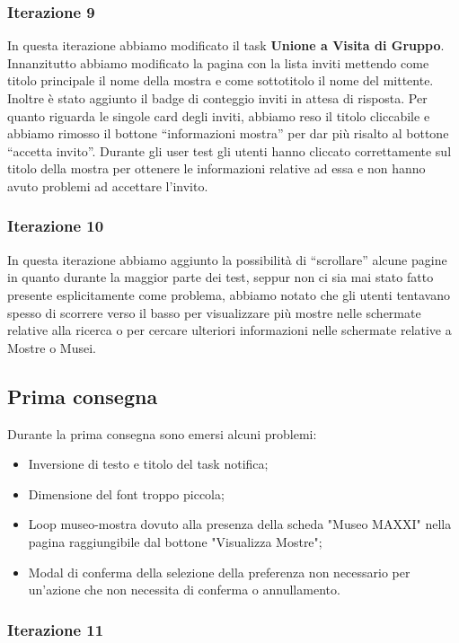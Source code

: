 \subsubsection{Iterazione 9}
In questa iterazione abbiamo modificato il task \textbf{Unione a Visita di Gruppo}. Innanzitutto abbiamo modificato la pagina con la lista inviti mettendo come titolo principale il nome della mostra e come sottotitolo il nome del mittente. Inoltre è stato aggiunto il badge di conteggio inviti in attesa di risposta. Per quanto riguarda le singole card degli inviti, abbiamo reso il titolo cliccabile e abbiamo rimosso il bottone ``informazioni mostra'' per dar più risalto al bottone ``accetta invito''. Durante gli user test gli utenti hanno cliccato correttamente sul titolo della mostra per ottenere le informazioni relative ad essa e non hanno avuto problemi ad accettare l'invito.

\subsubsection{Iterazione 10}
In questa iterazione abbiamo aggiunto la possibilità di ``scrollare'' alcune pagine in quanto durante la maggior parte dei test, seppur non ci sia mai stato fatto presente esplicitamente come problema, abbiamo notato che gli utenti tentavano spesso di scorrere verso il basso per visualizzare più mostre nelle schermate relative alla ricerca o per cercare ulteriori informazioni nelle schermate relative a Mostre o Musei.

\subsection{Prima consegna}
Durante la prima consegna sono emersi alcuni problemi:
\begin{itemize}
    \item Inversione di testo e titolo del task notifica;
    \item Dimensione del font troppo piccola;
    \item Loop museo-mostra dovuto alla presenza della scheda "Museo MAXXI" nella pagina raggiungibile dal bottone "Visualizza Mostre";
    \item Modal di conferma della selezione della preferenza non necessario per un'azione che non necessita di conferma o annullamento.
\end{itemize}

\subsubsection{Iterazione 11} \label{iterazione11}

